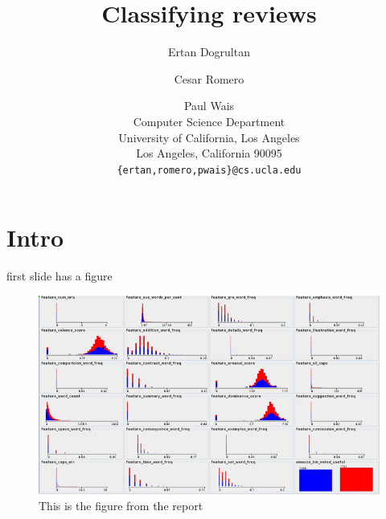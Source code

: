 \documentclass{beamer}
\title{Classifying reviews}
\author{Ertan Dogrultan \and Cesar Romero \and Paul Wais\\
Computer Science Department \\
University of California, Los Angeles\\
Los Angeles, California 90095\\
\texttt{\{ertan,romero,pwais\}@cs.ucla.edu}}
\begin{document}
\maketitle{}
\tableofcontents{}

\section{Intro}
\label{sec:intro}

\begin{frame}{first slide has a figure}
\begin{figure}[h]
  \centering
  \includegraphics[scale=.3]{features_distributions}
  \caption{This is the figure from the report}
  \label{fig:dist}
\end{figure}
\end{frame}
\end{document}
